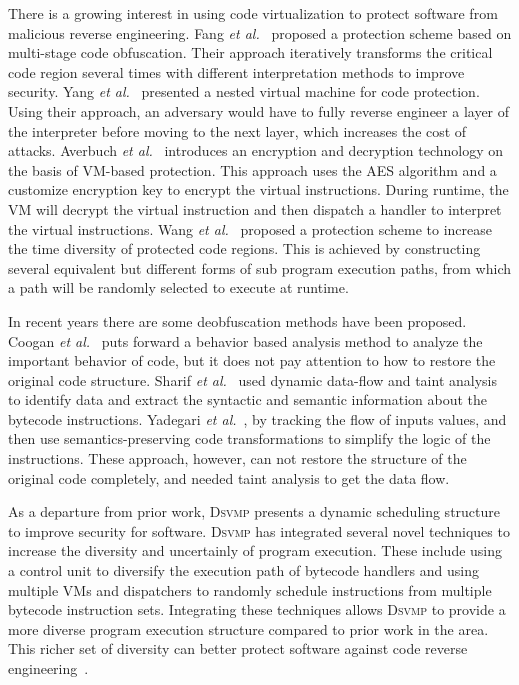 \documentclass[preprint,12pt,3p]{elsarticle}
\newcommand{\DSVMP}{\textsc{Dsvmp }}
\begin{document}
There is a growing interest in using code virtualization to protect software from malicious reverse engineering.
Fang \emph{et al.}~\cite{5fang2011multi} proposed a protection scheme based on multi-stage code obfuscation.
Their approach iteratively transforms the critical code region several times with different interpretation methods to improve security.
Yang \emph{et al.}~\cite{6ming2011software} presented a nested virtual machine for code protection.
Using their approach, an adversary would have to fully reverse engineer a layer of the interpreter before moving to the next layer,
which increases the cost of attacks.
Averbuch \emph{et al.}~\cite{27averbuch2011efficient} introduces an encryption and decryption technology
on the basis of VM-based protection. This approach uses the AES algorithm and a customize encryption key
to encrypt the virtual instructions. During runtime, the VM will decrypt the virtual instruction and then
dispatch a handler to interpret the virtual instructions.
Wang \emph{et al.}~\cite{7wang2014tdvmp} proposed a protection scheme to increase the time diversity of protected code regions.
This is achieved by constructing several equivalent but different forms of sub program execution paths,
from which a path will be randomly selected to execute at runtime.

In recent years there are some deobfuscation methods have been proposed. 
Coogan \emph{et al.}~\cite{coogan2011deobfuscation} puts forward a behavior based analysis method to analyze the important behavior of code, but it does not pay attention to how to restore the original code structure.
Sharif \emph{et al.}~\cite{sharif2009automatic} used dynamic data-flow and taint analysis to identify data and extract the syntactic and semantic information about the bytecode instructions.
Yadegari \emph{et al.}~\cite{Yadegari2015A}, by tracking the flow of inputs values, and then use semantics-preserving code transformations to simplify the logic of the instructions.
These approach, however, can not restore the structure of the original code completely, and needed taint analysis to get the data flow.

As a departure from prior work, \DSVMP presents a dynamic scheduling structure to improve security for software.
\DSVMP has integrated several novel techniques to increase the diversity and uncertainly of program execution.
These include using a control unit to diversify the execution path of bytecode handlers and using multiple VMs
and dispatchers to randomly schedule instructions from multiple bytecode instruction sets.
Integrating these techniques allows \DSVMP to provide a more diverse program execution structure compared to prior work in the area.
This richer set of diversity can better protect software against code reverse engineering~\cite{20larsen2014sok}.
\end{document}
